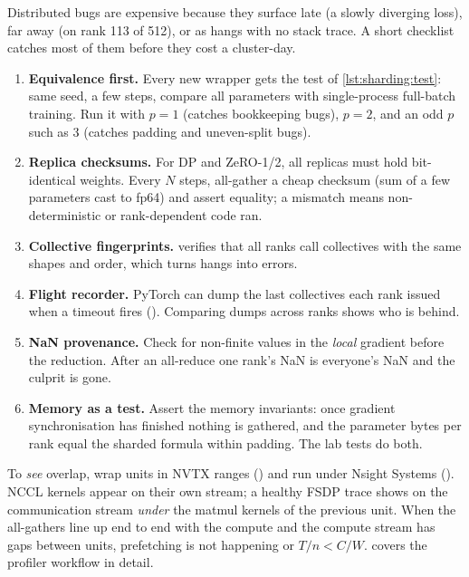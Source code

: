 Distributed bugs are expensive because they surface late (a slowly diverging loss), far away (on
rank 113 of 512), or as hangs with no stack trace. A short checklist catches most of them before
they cost a cluster-day.

\begin{enumerate}
  \item \textbf{Equivalence first.} Every new wrapper gets the test of \cref{lst:sharding:test}:
    same seed, a few steps, compare all parameters with single-process full-batch training. Run it
    with $p=1$ (catches bookkeeping bugs), $p=2$, and an odd $p$ such as 3 (catches padding and
    uneven-split bugs).
  \item \textbf{Replica checksums.} For DP and ZeRO-1/2, all replicas must hold bit-identical
    weights. Every $N$ steps, all-gather a cheap checksum (sum of a few parameters cast to fp64)
    and assert equality; a mismatch means non-deterministic or rank-dependent code ran.
  \item \textbf{Collective fingerprints.}  verifies that
    all ranks call collectives with the same shapes and order, which turns hangs into errors.
  \item \textbf{Flight recorder.} PyTorch can dump the last collectives each rank issued when a
    timeout fires (). Comparing dumps across ranks shows
    who is behind.
  \item \textbf{NaN provenance.} Check for non-finite values in the \emph{local} gradient before
    the reduction. After an all-reduce one rank's NaN is everyone's NaN and the culprit is gone.
  \item \textbf{Memory as a test.} Assert the memory invariants: once
    gradient synchronisation has finished nothing is gathered, and the parameter bytes
    per rank equal the sharded formula within padding. The lab tests do both.
\end{enumerate}

\begin{systemslens}
To \emph{see} overlap, wrap units in NVTX ranges
() and run under Nsight Systems
(). NCCL kernels appear on their own
stream; a healthy FSDP trace shows  on the communication stream
\emph{under} the matmul kernels of the previous unit. When the all-gathers line up end to end
with the compute and the compute stream has gaps between units, prefetching is not happening or
$T/n < C/W$.  covers the profiler workflow in detail.
\end{systemslens}

